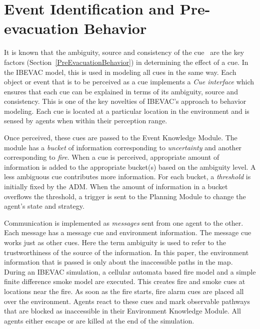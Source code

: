\section{Event Identification and Pre-evacuation Behavior}
\label{EventIdentification}

It is known that the ambiguity, source and consistency of the cue~\cite{Kuligowski:2005tt,Sime:1983uy,Tong:1985wn} are the key factors (Section~\ref{PreEvacuationBehavior}) in determining the effect of a cue. In the IBEVAC model, this is used in modeling all cues in the same way. Each object or event that is to be perceived as a cue implements a \emph{Cue interface} which ensures that each cue can be explained in terms of its ambiguity, source and consistency. This is one of the key novelties of IBEVAC's approach to behavior modeling. Each cue is located at a particular location in the environment and is sensed by agents when within their perception range.

Once perceived, these cues are passed to the Event Knowledge Module. The  module has a \emph{bucket} of information corresponding to \emph{uncertainty} and another corresponding to \emph{fire}. When a cue is perceived, appropriate amount of information is added to the appropriate bucket(s) based on the ambiguity level. A less ambiguous cue contributes more information. For each bucket, a \emph{threshold} is initially fixed by the ADM. When the amount of information in a bucket overflows the threshold, a trigger is sent to the Planning Module to change the agent's state and strategy.

Communication is implemented as \emph{messages} sent from one agent to the other. Each message has a message cue and environment information. The message cue works just as other cues. Here the term ambiguity is used to refer to the trustworthiness of the source of the information. In this paper, the environment information that is passed is only about the inaccessible paths in the map. %
During an IBEVAC simulation, a cellular automata based fire model and a simple finite difference smoke model are executed. This creates fire and smoke cues at locations near the fire. As soon as the fire starts, fire alarm cues are placed all over the environment. Agents react to these cues and mark observable pathways that are blocked as inaccessible in their Environment Knowledge Module. All agents either escape or are killed at the end of the simulation.




